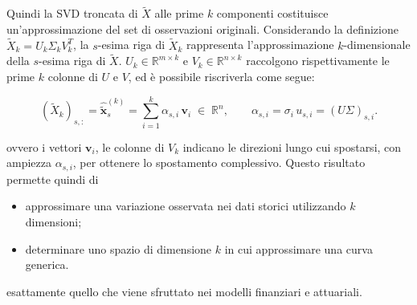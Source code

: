 \documentclass[11pt,a4paper]{article}
\theoremstyle{plain}
\theoremstyle{definition}
\theoremstyle{remark}
\begin{document}
Quindi la SVD troncata di $\tilde X$ alle
prime $k$ componenti costituisce un'approssimazione del set di osservazioni originali. Considerando la definizione
$\tilde{X}_k = U_k \Sigma_k V_k^T$, la $s$-esima riga di $\tilde{X}_k$ rappresenta l'approssimazione $k$-dimensionale della $s$-esima riga di $\tilde{X}$.
$U_k \in \mathbb{R}^{m \times k}$ e $V_k \in \mathbb{R}^{n \times k}$ raccolgono
rispettivamente le prime $k$ colonne di $U$ e $V$, ed è possibile riscriverla
come segue:

\begin{equation}
  (\tilde{X}_k)_{s,:} = \hat{\tilde{\mathbf{x}}}_s^{(k)}
  = \sum_{i=1}^{k} \alpha_{s,i}\,\mathbf{v}_i
  \;\in\; \mathbb{R}^n,
  \qquad
  \alpha_{s,i} = \sigma_i\,u_{s,i} = (U\Sigma)_{s,i}.
  \label{eq:ric_mese_centrata}
\end{equation}

ovvero i vettori $\mathbf{v}_i$, le colonne di $V_k$ indicano le direzioni lungo cui spostarsi, con
ampiezza $\alpha_{s,i}$, per ottenere lo spostamento complessivo. Questo risultato permette quindi di
\begin{itemize}
\item approssimare una variazione osservata nei dati storici utilizzando $k$ dimensioni;
\item determinare uno spazio di dimensione $k$ in cui approssimare una curva generica.
\end{itemize}
esattamente quello che viene sfruttato nei modelli finanziari e attuariali. 

\end{document}

